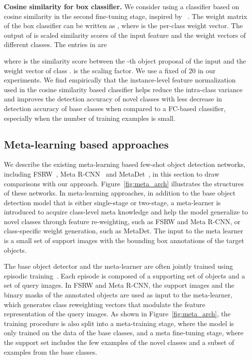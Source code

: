 \documentclass{article}
\newcommand\minisection[1]{\vspace{1mm}\noindent \textbf{#1}}
\begin{document}
\minisection{Cosine similarity for box classifier.} We consider using a classifier based on cosine similarity in the second fine-tuning stage, inspired by ~\citet{gidaris2018dynamic,qi2018low,chen2019closer}. The weight matrix  of the box classifier  can be written as , where  is the per-class weight vector. The output of  is scaled similarity scores  of the input feature  and the weight vectors of different classes. The entries in  are 

where  is the similarity score between the -th object proposal of the input  and the weight vector of class .  is the scaling factor. We use a fixed  of 20 in our experiments. We find empirically that the instance-level feature 
normalization used in the cosine similarity based classifier helps reduce the intra-class
variance and improves the detection accuracy of novel classes with less decrease in detection accuracy of base classes when compared to a FC-based classifier, especially when the number of training examples is small.

\subsection{Meta-learning based approaches}
\label{sec:meta}
We describe the existing meta-learning based few-shot object detection networks, including FSRW~\cite{kang2019few}, Meta R-CNN~\cite{yan2019meta} and MetaDet~\cite{wang2019meta}, in 
this section to draw comparisons with our approach.
Figure~\ref{fig:meta_arch} illustrates the structures of these networks.
In meta-learning approaches, in addition to the base object detection model that is either single-stage or 
two-stage, a meta-learner is introduced to acquire class-level meta knowledge and
help the model generalize to novel classes through feature re-weighting, such as FSRW
and Meta R-CNN, or class-specific weight generation, such as MetaDet. The input to the
meta learner is a small set of support images with the bounding box annotations of the target objects. 

The base object detector and the meta-learner are often jointly trained using episodic training~\cite{vinyals2016matching}.
Each episode is composed of a supporting set of  objects and a set of query images.
In FSRW and Meta R-CNN, the support images and the binary masks of the annotated objects are used as input to the meta-learner, which generates class reweighting vectors that modulate the feature representation of the query images.
As shown in Figure~\ref{fig:meta_arch}, the training procedure is also split into a meta-training stage, where the model is only trained on the data of the base classes, and a meta fine-tuning stage, where the support set includes the few examples of the novel classes and a subset of examples from the base classes.
\end{document}
